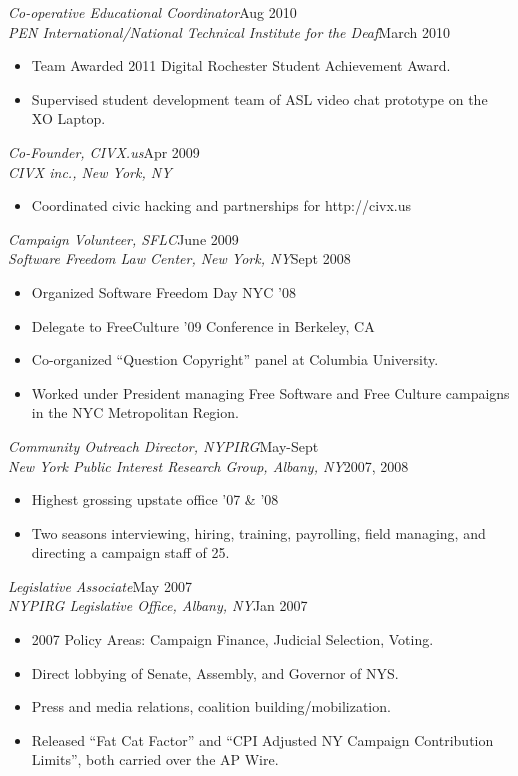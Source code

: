 \documentclass[margin]{res}
\newcommand{\wherewhen}[2]{{\sl #1}\hfill #2}
\begin{document}
\begin{resume}
    \wherewhen{Co-operative Educational Coordinator}{Aug 2010}\\
    \wherewhen{PEN International/National Technical Institute for the Deaf}{March 2010}
    \begin{itemize}
        \item Team Awarded 2011 Digital Rochester Student Achievement Award.
        \item Supervised student development team of ASL video chat prototype on the XO Laptop.
    \end{itemize}

    \pagebreak

    \wherewhen{Co-Founder, CIVX.us}{Apr 2009}\\
    \wherewhen{CIVX inc., New York, NY}
    \begin{itemize}
        \item Coordinated civic hacking and partnerships for http://civx.us
    \end{itemize}

    \wherewhen{Campaign Volunteer, SFLC}{June 2009}\\
    \wherewhen{Software Freedom Law Center, New York, NY}{Sept 2008}
    \begin{itemize}
        \item Organized Software Freedom Day NYC '08
        \item Delegate to FreeCulture '09 Conference in Berkeley, CA
        \item Co-organized ``Question Copyright'' panel at Columbia University.
        \item Worked under President managing Free Software and Free Culture campaigns in the NYC Metropolitan Region.
    \end{itemize}

    \wherewhen{Community Outreach Director, NYPIRG}{May-Sept}\\
    \wherewhen{New York Public Interest Research Group, Albany, NY}{2007, 2008}
    \begin{itemize}
        \item Highest grossing upstate office '07 \& '08
        \item Two seasons interviewing, hiring, training, payrolling, field managing, and directing a campaign staff of 25.
    \end{itemize}

    \wherewhen{Legislative Associate}{May 2007}\\
    \wherewhen{NYPIRG Legislative Office, Albany, NY}{Jan 2007}
    \begin{itemize}
        \item 2007 Policy Areas: Campaign Finance, Judicial Selection, Voting.
        \item Direct lobbying of Senate, Assembly, and Governor of NYS.
        \item Press and media relations, coalition building/mobilization.
        \item Released ``Fat Cat Factor'' and ``CPI Adjusted NY Campaign Contribution Limits'', both carried over the AP Wire.
    \end{itemize}


\end{resume}
\end{document}
